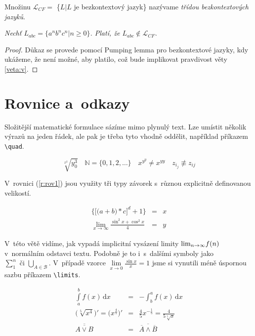 \documentclass[11pt,a4paper,twocolumn,titlepage]{article}
\begin{document}
\begin{definition}
Množinu $\mathcal{L}_{CF} =$ \{$L|L$ {je bezkontextový jazyk}\} nazývame \emph{třídou bezkontextových jazyků}.
\end{definition}

\begin{sentence} \label{veta:v}
\emph{Nechť $L_{abc} = \{a^n b^n c^n|n \geq 0\}$. Platí, že $L_{abc} \notin \mathcal{L}_{CF}$.}
\end{sentence}

\begin{proof}
Důkaz se provede pomocí Pumping lemma pro bezkontextové jazyky, kdy ukážeme, že není možné, aby platilo, což bude implikovat pravdivost věty \ref{veta:v}.
\end{proof}

\section{Rovnice a~odkazy}
Složitější matematické formulace sázíme mimo plynulý text. Lze umístit několik výrazů na jeden řádek, ale pak je třeba tyto vhodně oddělit, například příkazem \verb|\quad|.

$$\sqrt[x^2]{y^3_0} \quad \mathbb{N} = \{0{,}1{,}2{,}\dots\} \quad x^{y^y} \neq x^{yy}  \quad z_{i_j} \not\equiv z_{ij}$$

V~rovnici (\ref{r:rov1}) jsou využity tři typy závorek s~různou explicitně definovanou velikostí.

\begin{eqnarray} \label{r:rov1}
\bigg\{\Big[\big(a+b\big)*c\Big]^d +1 \bigg\} & = & x \\
\lim_{x \rightarrow \infty}\frac{\sin^2 x + \cos^2 x}{4} & = & y \nonumber
\end{eqnarray}

V~této větě vidíme, jak vypadá implicitní vysázení li\-mity $\textup{lim}_{n \rightarrow \infty}f(n)$ v~normálním odstavci textu. 
Podobně je to i~s~dalšími symboly jako $\sum^n_1 \mbox{ či } \bigcup_{A \in \mathcal{B}}$. V~případě vzorce $\lim\limits_{x \rightarrow 0} \frac{\sin x}{x} = 1$ jsme si vynutili méně úspornou sazbu příkazem \verb|\limits|.

\begin{eqnarray}
\int\limits^b_a f(x)\,\mathrm{d}x & = & -\int^a_b f(x)\,\mathrm{d}x \\
\Big(\sqrt[5]{x^4}\Big)' = \Big(x^{\frac{4}{5}}\Big)' & = & {\frac{4}{5}}x^{-{\frac{1}{5}}} = {\frac{4}{5\sqrt[5]{x}}} \\
\overline{\overline{A \vee B}} & = & \overline{\overline{A}\wedge \overline{B}}
\end{eqnarray}
\end{document}
